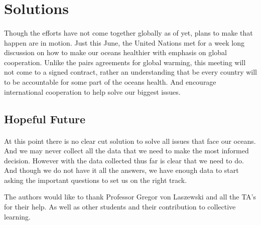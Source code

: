 \documentclass[sigconf]{acmart}
\begin{document}
\section{Solutions}

\paragraph{}
Though the efforts have not come together globally as of yet, plans to make that happen are in motion. Just this June, the United Nations met for a week long discussion on how to make our oceans healthier with emphasis on global cooperation. \cite{Woody}  Unlike the pairs agreements for global warming, this meeting will not come to a signed contract, rather an understanding that be every country will to be accountable for some part of the oceans health.  And encourage international cooperation to help solve our biggest issues. 

\subsection{Hopeful Future}

\paragraph{}
At this point there is no clear cut solution to solve all issues that face our oceans.  And we may never collect all the data that we need to make the most informed decision.  However with the data collected thus far is clear that we need to do. And though we do not have it all the answers, we have enough data to start asking the important questions to set us on the right track. 
 
\begin{acks}
  The authors would like to thank Professor Gregor von Laszewski and all the TA's for their help.  As well as other students and their contribution to collective learning.
\end{acks}
 

 
 
\end{document}
